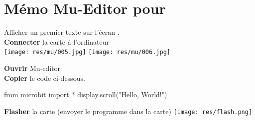 
\section{Mémo Mu-Editor pour \mbpy}



\begin{methode}[1er programme]
	\begin{multicols}{2}
		Afficher un premier texte sur l'écran \mb.\\	
		\textbf{Connecter} la carte à l'ordinateur
		\\[1em]
		
		\texttt{[image: res/mu/005.jpg]}
		\texttt{[image: res/mu/006.jpg]}
		
	\columnbreak


	\textbf{Ouvrir} Mu-editor\\
	\textbf{Copier} le code ci-dessous.
	\begin{mucode}
from microbit import *
display.scroll("Hello, World!")
	\end{mucode}
	\textbf{Flasher} la carte {\tiny(envoyer le programme dans 
	la carte)}
	\hfill \texttt{[image: res/flash.png]}
	\end{multicols}
\end{methode}

	

